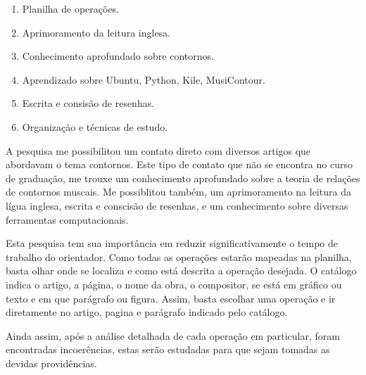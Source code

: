 \documentclass[11pt]{article}
\begin{document}
\begin{enumerate}
\item Planilha de operações.
\item Aprimoramento da leitura inglesa.
\item Conhecimento aprofundado sobre contornos.
\item Aprendizado sobre Ubuntu, Python, Kile, MusiContour.
\item Escrita e consisão de resenhas.
\item Organização e técnicas de estudo.
\end{enumerate}


\label{sec:discussao}

A pesquisa me possibilitou um contato direto com diversos artigos que abordavam
o tema contornos. Este tipo de contato que não se encontra no curso de graduação,
me trouxe um conhecimento aprofundado sobre a teoria de relações de contornos muscais.
Me possiblitou também, um aprimoramento na leitura da lígua inglesa, escrita e conscisão
de resenhas, e um conhecimento sobre diversas ferramentas computacionais.

Esta pesquisa tem sua importância em reduzir significativamente o
tempo de trabalho do orientador. Como todas as operações estarão mapeadas
na planilha, basta olhar onde se localiza e como está descrita a operação
desejada. O catálogo indica o artigo, a página, o nome da obra, o compositor,
se está em gráfico ou texto e em que parágrafo ou figura. Assim, basta escolhar
uma operação e ir diretamente no artigo, pagina e parágrafo indicado pelo
catálogo.

Ainda assim, após a análise detalhada de cada operação em particular,
foram encontradas incoerências, estas serão estudadas para que sejam
tomadas as devidas providências.
\end{document}
